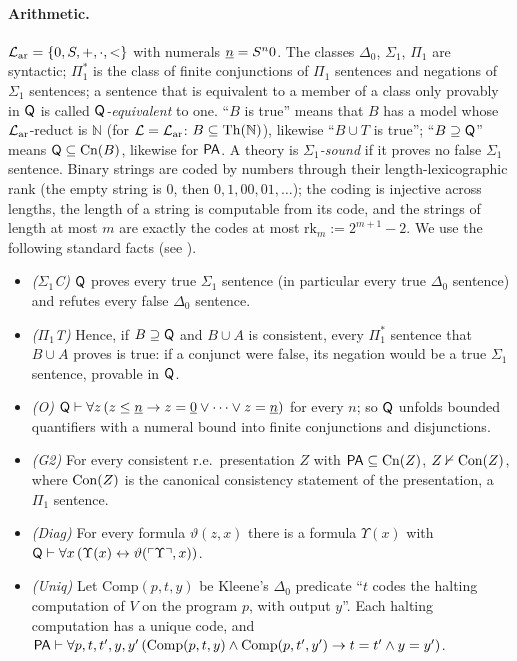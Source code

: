 \paragraph{Arithmetic.} $\mathcal{L}_{\mathrm{ar}}=\{0,S,+,\cdot,<\}$ with numerals $\underline{n}=S^n0$. The classes $\Delta_0$, $\Sigma_1$, $\Pi_1$ are syntactic; $\Pi_1^*$ is the class of finite conjunctions of $\Pi_1$ sentences and negations of $\Sigma_1$ sentences; a sentence that is equivalent to a member of a class only provably in $\mathsf{Q}$ is called \emph{$\mathsf{Q}$-equivalent} to one. ``$B$ is true'' means that $B$ has a model whose $\mathcal{L}_{\mathrm{ar}}$-reduct is $\mathbb N$ (for $\mathcal L=\mathcal{L}_{\mathrm{ar}}$: $B\subseteq\mathrm{Th}(\mathbb N)$), likewise ``$B\cup T$ is true''; ``$B\supseteq\mathsf{Q}$'' means $\mathsf{Q}\subseteq\mathrm{Cn}(B)$, likewise for $\mathsf{PA}$. A theory is \emph{$\Sigma_1$-sound} if it proves no false $\Sigma_1$ sentence. Binary strings are coded by numbers through their length-lexicographic rank (the empty string is $0$, then $0,1,00,01,\dots$); the coding is injective across lengths, the length of a string is computable from its code, and the strings of length at most $m$ are exactly the codes at most $\mathrm{rk}_m:=2^{m+1}-2$. We use the following standard facts (see \citealp{smorynski1977incompleteness,boolos2007computability}).
\begin{itemize}[leftmargin=*]
\item \emph{($\Sigma_1$C)} $\mathsf{Q}$ proves every true $\Sigma_1$ sentence (in particular every true $\Delta_0$ sentence) and refutes every false $\Delta_0$ sentence.
\item \emph{($\Pi_1$T)} Hence, if $B\supseteq\mathsf{Q}$ and $B\cup A$ is consistent, every $\Pi_1^*$ sentence that $B\cup A$ proves is true: if a conjunct were false, its negation would be a true $\Sigma_1$ sentence, provable in $\mathsf{Q}$.
\item \emph{(O)} $\mathsf{Q}\vdash\forall z\,(z\le\underline{n}\to z=\underline{0}\vee\dots\vee z=\underline{n})$ for every $n$; so $\mathsf{Q}$ unfolds bounded quantifiers with a numeral bound into finite conjunctions and disjunctions.
\item \emph{(G2)} For every consistent r.e.\ presentation $Z$ with $\mathsf{PA}\subseteq\mathrm{Cn}(Z)$, $Z\nvdash\mathrm{Con}(Z)$, where $\mathrm{Con}(Z)$ is the canonical consistency statement of the presentation, a $\Pi_1$ sentence.
\item \emph{(Diag)} For every formula $\vartheta(z,x)$ there is a formula $\Upsilon(x)$ with $\mathsf{Q}\vdash\forall x\,(\Upsilon(x)\leftrightarrow\vartheta(\ulcorner \Upsilon\urcorner,x))$.
\item \emph{(Uniq)} Let $\mathrm{Comp}(p,t,y)$ be Kleene's $\Delta_0$ predicate ``$t$ codes the halting computation of $V$ on the program $p$, with output $y$''. Each halting computation has a unique code, and $\mathsf{PA}\vdash\forall p,t,t',y,y'\,(\mathrm{Comp}(p,t,y)\wedge\mathrm{Comp}(p,t',y')\to t=t'\wedge y=y')$.
\end{itemize}

